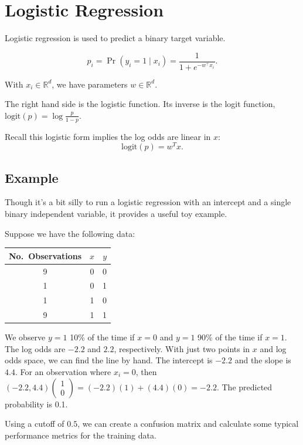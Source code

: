 \section{Logistic Regression}

Logistic regression is used to predict a binary target variable. 

$$p_i=\Pr(y_i=1\mid x_i)=\frac{1}{1+e^{-w^\top x_i}}.$$


With $x_i \in \mathbb{R}^d$, we have parameters $w \in \mathbb{R}^d$. 

The right hand side is the logistic function. Its inverse is the logit function, $\text{logit}(p) = \log \frac{p}{1-p}$.

Recall this logistic form implies the log odds are linear in $x$:
$$\text{logit}(p) = w^T x.$$


\subsection{Example}

Though it's a bit silly to run a logistic regression with an intercept and a single binary independent variable, it provides a useful toy example. 

Suppose we have the following data:

\begin{center}
\begin{tabular}{ccc}
\toprule 
No.\ Observations & $x$ & $y$ \\
\midrule
9 & 0 & 0 \\
1 & 0 & 1 \\
1 & 1 & 0 \\
9 & 1 & 1 \\
\bottomrule
\end{tabular}
\end{center}

We observe $y=1$ 10\% of the time if $x=0$ and $y=1$ 90\% of the time if $x=1$. The log odds are $-2.2$ and $2.2$, respectively. With just two points in $x$ and log odds space, we can find the line by hand. The intercept is $-2.2$ and the slope is $4.4$. For an observation where $x_i=0$, then 
$(-2.2, 4.4) \begin{pmatrix} 1 \\ 0 \end{pmatrix} = (-2.2)(1) + (4.4)(0) = -2.2.$ The predicted probability is 0.1. 

Using a cutoff of $0.5$, we can create a confusion matrix and calculate some typical performance metrics for the training data. 

